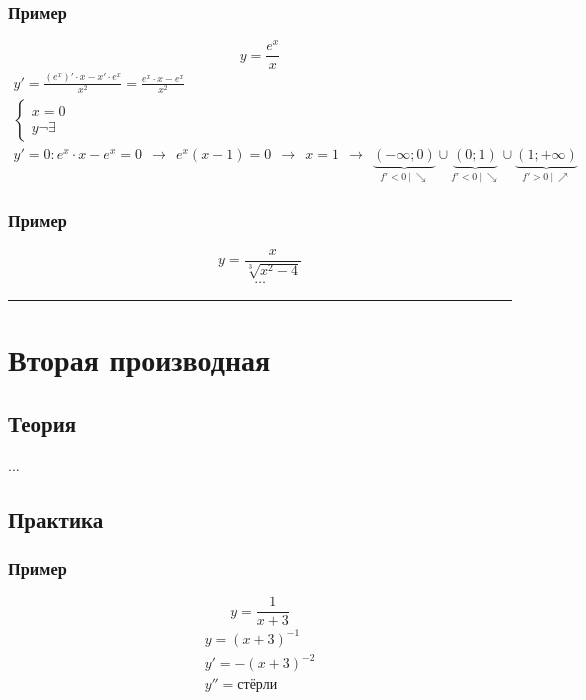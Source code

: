 \documentclass{article}
\begin{document}
\subsubsection{Пример}
\[
    y = \frac{e^x}{x}
\]
\begin{gather*}
    y' = \frac{(e^x)' \cdot x - x' \cdot e^x}{x^2} =
    \frac{e^x \cdot x - e^x}{x^2} \\
    \begin{cases}
        x = 0 \\
        y \neg \exists
    \end{cases} \\
    y' = 0: e^x \cdot x - e^x = 0 ~~\rightarrow~~ 
    e^x(x - 1) = 0 ~~\rightarrow~~ 
    x = 1 ~~\rightarrow~~
    \underbrace{(-\infty; 0)}_{f' < 0 ~|~ \searrow} \cup \underbrace{(0; 1)}_{f' < 0 ~|~ \searrow} \cup \underbrace{(1; +\infty)}_{f' > 0 ~|~ \nearrow}
\end{gather*}

\subsubsection{Пример}
\[
    y = \frac{x}{\sqrt[3]{x^2 - 4}}
\]
\begin{gather*}
    \dots
\end{gather*}



\par\noindent\rule{\textwidth}{1pt}
\section{Вторая производная}

\subsection{Теория}
...


\subsection{Практика}

\subsubsection{Пример}
\[
    y = \frac{1}{x + 3}
\]
\begin{gather*}
    y = (x + 3)^{-1} \\
    y' = -(x + 3)^{-2} \\
    y'' = \text{стёрли}
\end{gather*}
\end{document}
